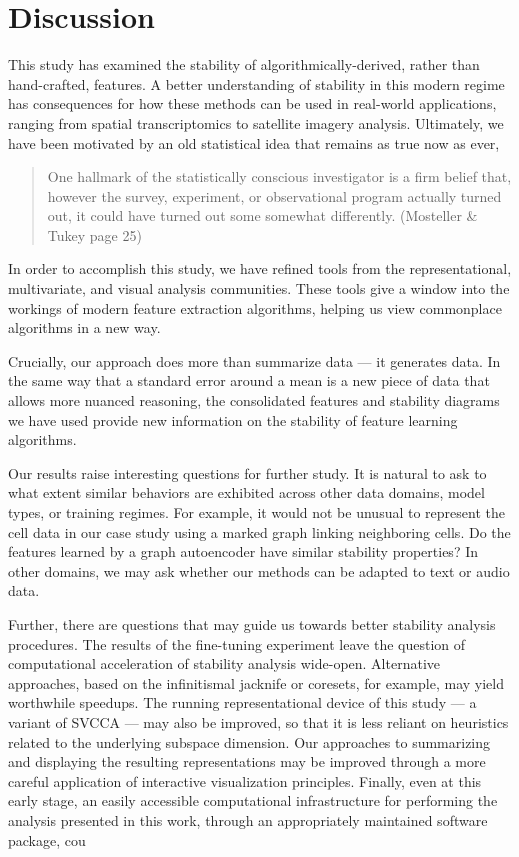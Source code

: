 
\section{Discussion}

This study has examined the stability of algorithmically-derived, rather than hand-crafted, features. A better understanding of stability in this modern regime has consequences for how these methods can be used in real-world applications, ranging from spatial transcriptomics to satellite imagery analysis. Ultimately, we have been motivated by an old statistical idea that remains as true now as ever,

\begin{quote}
One hallmark of the statistically conscious investigator is a firm belief that, however the survey, experiment, or observational program actually turned out, it could have turned out some somewhat differently. (Mosteller \& Tukey page 25)
\end{quote}

In order to accomplish this study, we have refined tools from the representational, multivariate, and visual analysis communities. These tools give a window into the workings of modern feature extraction algorithms, helping us view commonplace algorithms in a new way.

Crucially, our approach does more than summarize data — it generates data. In the same way that a standard error around a mean is a new piece of data that allows more nuanced reasoning, the consolidated features and stability diagrams we have used provide new information on the stability of feature learning algorithms. 

Our results raise interesting questions for further study. It is natural to ask to what extent similar behaviors are exhibited across other data domains, model types, or training regimes. For example, it would not be unusual to represent the cell data in our case study using a marked graph linking neighboring cells. Do the features learned by a graph autoencoder have similar stability properties? In other domains, we may ask whether our methods can be adapted to text or audio data.

Further, there are questions that may guide us towards better stability analysis procedures. The results of the fine-tuning experiment leave the question of computational acceleration of stability analysis wide-open. Alternative approaches, based on the infinitismal jacknife or coresets, for example, may yield worthwhile speedups. The running representational device of this study — a variant of SVCCA — may also be improved, so that it is less reliant on heuristics related to the underlying subspace dimension. Our approaches to summarizing and displaying the resulting representations may be improved through a more careful application of interactive visualization principles. Finally, even at this early stage, an easily accessible computational infrastructure for performing the analysis presented in this work, through an appropriately maintained software package, cou
